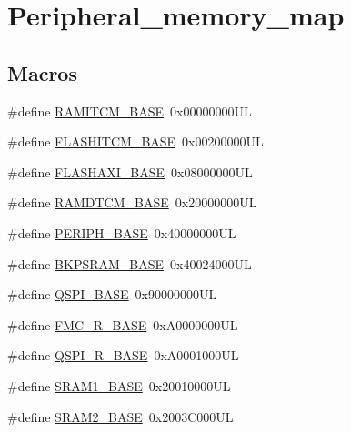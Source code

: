 \hypertarget{group___peripheral__memory__map}{}\section{Peripheral\+\_\+memory\+\_\+map}
\label{group___peripheral__memory__map}
\subsection*{Macros}
\begin{DoxyCompactItemize}
\item 
\#define \mbox{\hyperlink{group___peripheral__memory__map_ga8f6d2f2cfd1a621b4ff5d35544ec9f6f}{R\+A\+M\+I\+T\+C\+M\+\_\+\+B\+A\+SE}}~0x00000000\+UL
\item 
\#define \mbox{\hyperlink{group___peripheral__memory__map_ga2154d7b7ccb4f2647df165fbd056c130}{F\+L\+A\+S\+H\+I\+T\+C\+M\+\_\+\+B\+A\+SE}}~0x00200000\+UL
\item 
\#define \mbox{\hyperlink{group___peripheral__memory__map_gac3b4a5c22d8538b98de5a11301cd1a47}{F\+L\+A\+S\+H\+A\+X\+I\+\_\+\+B\+A\+SE}}~0x08000000\+UL
\item 
\#define \mbox{\hyperlink{group___peripheral__memory__map_ga6882288e66a83d0050e0abcd999c893e}{R\+A\+M\+D\+T\+C\+M\+\_\+\+B\+A\+SE}}~0x20000000\+UL
\item 
\#define \mbox{\hyperlink{group___peripheral__memory__map_ga9171f49478fa86d932f89e78e73b88b0}{P\+E\+R\+I\+P\+H\+\_\+\+B\+A\+SE}}~0x40000000\+UL
\item 
\#define \mbox{\hyperlink{group___peripheral__memory__map_ga52e57051bdf8909222b36e5408a48f32}{B\+K\+P\+S\+R\+A\+M\+\_\+\+B\+A\+SE}}~0x40024000\+UL
\item 
\#define \mbox{\hyperlink{group___peripheral__memory__map_ga4c3147bf44b5434facb53bb9aa88ca31}{Q\+S\+P\+I\+\_\+\+B\+A\+SE}}~0x90000000\+UL
\item 
\#define \mbox{\hyperlink{group___peripheral__memory__map_ga7a599164cd92798542bc6288793d1ed5}{F\+M\+C\+\_\+\+R\+\_\+\+B\+A\+SE}}~0x\+A0000000\+UL
\item 
\#define \mbox{\hyperlink{group___peripheral__memory__map_ga3b6b7d9c67dec50557fd634505198e9d}{Q\+S\+P\+I\+\_\+\+R\+\_\+\+B\+A\+SE}}~0x\+A0001000\+UL
\item 
\#define \mbox{\hyperlink{group___peripheral__memory__map_ga7d0fbfb8894012dbbb96754b95e562cd}{S\+R\+A\+M1\+\_\+\+B\+A\+SE}}~0x20010000\+UL
\item 
\#define \mbox{\hyperlink{group___peripheral__memory__map_gadbb42a3d0a8a90a79d2146e4014241b1}{S\+R\+A\+M2\+\_\+\+B\+A\+SE}}~0x2003\+C000\+UL

\end{DoxyCompactItemize}
